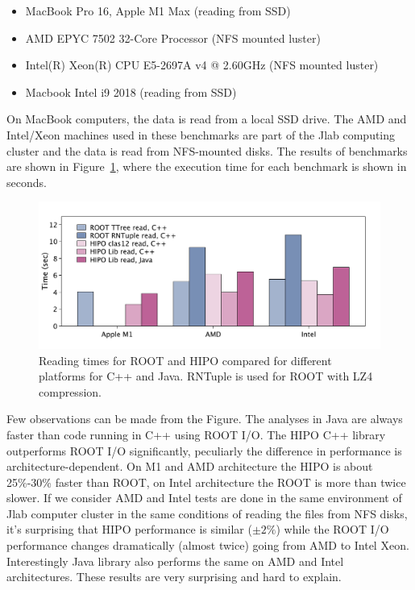 \documentclass[preprint,12pt]{elsarticle}
\begin{document}
\begin{itemize}
\item MacBook Pro 16, Apple M1 Max (reading from SSD)
\item AMD EPYC 7502 32-Core Processor (NFS mounted luster)
\item Intel(R) Xeon(R) CPU E5-2697A v4 @ 2.60GHz (NFS mounted luster)
\item Macbook Intel i9 2018 (reading from SSD)
\end{itemize}

On MacBook computers, the data is read from a local SSD drive.
The AMD and Intel/Xeon machines used in these benchmarks are part of the Jlab computing cluster 
and the data is read from NFS-mounted disks. The results of benchmarks are shown in Figure~\ref{benchmark:read},
where the execution time for each benchmark is shown in seconds.

 \begin{figure}[!h]
\begin{center}
  \includegraphics[width=5.0in]{bench_root_vs_hipo_read.pdf}
 \caption { Reading times for ROOT and HIPO compared for different platforms for C++ and Java. RNTuple is used for ROOT with LZ4 compression.}
 \label{benchmark:read}
 \end{center}
 \end{figure}

Few observations can be made from the Figure. The analyses in Java are always faster than code running in C++ using ROOT I/O. 
The HIPO C++ library outperforms ROOT I/O significantly, peculiarly the difference in performance is architecture-dependent. 
On M1 and AMD architecture the HIPO is about 25\%-30\% faster than ROOT, on Intel architecture the ROOT is more than twice slower.
If we consider AMD and Intel tests are done in the same environment of Jlab computer cluster in the same conditions of reading the files from NFS 
disks, it's surprising that HIPO performance is similar ($\pm 2\%$) while the ROOT I/O performance changes dramatically (almost twice) going 
from AMD to Intel Xeon. Interestingly Java library also performs the same on AMD and Intel architectures. These results are very surprising and 
hard to explain.
\end{document}
